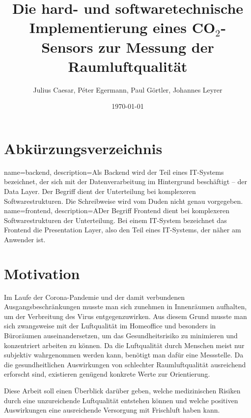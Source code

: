 \documentclass[a4paper,
    11pt,
    headings=small,
    ngerman,
    listof=totoc,
    numbers=noenddot]{scrreprt}[2021/11/13]
\title{Die hard- und softwaretechnische Implementierung eines CO$_2$-Sensors zur Messung der Raumluftqualität}
\author{Julius Caesar, Péter Egermann, Paul Görtler, Johannes Leyrer}
\date{\today}
\begin{document}
\maketitle

\newpage

\tableofcontents

\newpage

\chapter*{Abkürzungsverzeichnis}

\begin{acronym}[API]
\end{acronym}

{
  name=backend,
  description={Als Backend wird der Teil eines IT-Systems bezeichnet, der sich mit der Datenverarbeitung im Hintergrund beschäftigt – der Data Layer. Der Begriff dient der Unterteilung bei komplexeren Softwarestrukturen. Die Schreibweise wird vom Duden nicht genau vorgegeben. \autocite{backend_definition}}
}
{
  name=frontend,
  description={ADer Begriff Frontend dient bei komplexeren Softwarestrukturen der Unterteilung. Bei einem IT-System bezeichnet das Frontend die Presentation Layer, also den Teil eines IT-Systems, der näher am Anwender ist. \autocite{frontend_definition}}
}

\newpage


\chapter{Motivation}

Im Laufe der Corona-Pandemie und der damit verbundenen Ausgangsbeschränkungen musste man sich zunehmen in Innenräumen aufhalten, um der Verbreitung des Virus entgegenzuwirken. Aus diesem Grund musste man sich zwangsweise mit der Luftqualität im Homeoffice und besonders in Büroräumen auseinandersetzen, um das Gesundheitsrisiko zu minimieren und konzentriert arbeiten zu können. Da die Luftqualität durch Menschen meist nur subjektiv wahrgenommen werden kann, benötigt man dafür eine Messstelle. Da die gesundheitlichen Auswirkungen von schlechter Raumluftqualität ausreichend erforscht sind, existieren genügend konkrete Werte zur Orientierung.

Diese Arbeit soll einen Überblick darüber geben, welche medizinischen Risiken durch eine unzureichende Luftqualität entstehen können und welche positiven Auswirkungen eine ausreichende Versorgung mit Frischluft haben kann.
\end{document}
